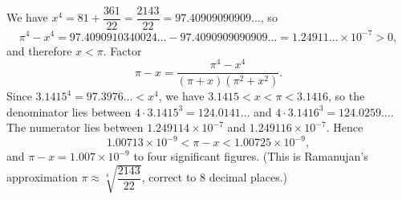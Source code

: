 We have $x^4=81+\dfrac{361}{22}=\dfrac{2143}{22}=97.40909090909\ldots$, so
\[\pi^4-x^4=97.4090910340024\ldots-97.4090909090909\ldots=1.24911\ldots\times10^{-7}>0,\]
and therefore $x<\pi$. Factor
\[\pi-x=\dfrac{\pi^4-x^4}{(\pi+x)\left(\pi^2+x^2\right)}.\]
Since $3.1415^4=97.3976\ldots<x^4$, we have $3.1415<x<\pi<3.1416$, so the denominator lies between $4\cdot3.1415^3=124.0141\ldots$ and $4\cdot3.1416^3=124.0259\ldots$. The numerator lies between $1.249114\times10^{-7}$ and $1.249116\times10^{-7}$. Hence
\[1.00713\times10^{-9}<\pi-x<1.00725\times10^{-9},\]
and $\pi-x=\boxed{1.007\times10^{-9}}$ to four significant figures. (This is Ramanujan's approximation $\pi\approx\sqrt[4]{\dfrac{2143}{22}}$, correct to $8$ decimal places.)
